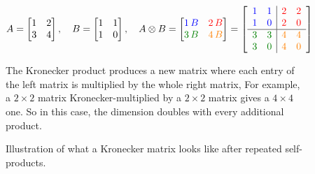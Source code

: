 \begin{figure}[htbp]
  \centering
  \[
    A=\begin{bmatrix}1&2\\3&4\end{bmatrix},\quad
    B=\begin{bmatrix}1&1\\1&0\end{bmatrix},\quad
    A\otimes B=
    \begin{bmatrix}\textcolor{blue}{1\,B}&\textcolor{red}{2\,B}\\\textcolor{green!50!black}{3\,B}&\textcolor{orange}{4\,B}\end{bmatrix}
    =
    \left[\begin{array}{cc|cc}
      \textcolor{blue}{1}&\textcolor{blue}{1}&\textcolor{red}{2}&\textcolor{red}{2}\\
      \textcolor{blue}{1}&\textcolor{blue}{0}&\textcolor{red}{2}&\textcolor{red}{0}\\\hline
      \textcolor{green!50!black}{3}&\textcolor{green!50!black}{3}&\textcolor{orange}{4}&\textcolor{orange}{4}\\
      \textcolor{green!50!black}{3}&\textcolor{green!50!black}{0}&\textcolor{orange}{4}&\textcolor{orange}{0}
    \end{array}\right]
  \]
  \caption{The Kronecker product produces a new matrix where each entry of the left matrix is multiplied by the whole right matrix, For example, a $2\times2$ matrix Kronecker-multiplied by a $2\times2$ matrix gives a $4\times4$ one. So in this case, the dimension doubles with every additional product.}
  \label{fig:kronecker-math}
\end{figure}

\begin{figure}[htbp]
  \centering
  \caption{Illustration of what a Kronecker matrix looks like after repeated self-products.}
  \label{fig:kronecker-visual}
\end{figure}

